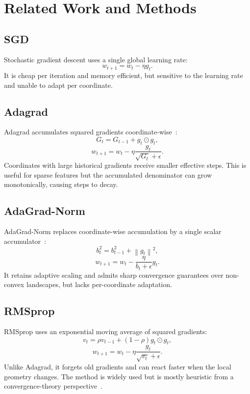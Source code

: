 \documentclass{article}
\newcommand{\norm}[1]{\left\lVert #1 \right\rVert}
\begin{document}
\section{Related Work and Methods}
\subsection{SGD}
Stochastic gradient descent uses a single global learning rate:
\begin{equation}
    w_{t+1}=w_t-\eta g_t.
\end{equation}
It is cheap per iteration and memory efficient, but sensitive to the learning rate and unable to adapt per coordinate.

\subsection{Adagrad}
Adagrad accumulates squared gradients coordinate-wise~\citep{duchi2011adaptive}:
\begin{equation}
    G_t=G_{t-1}+g_t\odot g_t,
\end{equation}
\begin{equation}
    w_{t+1}=w_t-\eta \frac{g_t}{\sqrt{G_t}+\epsilon}.
\end{equation}
Coordinates with large historical gradients receive smaller effective steps. This is useful for sparse features but the accumulated denominator can grow monotonically, causing steps to decay.

\subsection{AdaGrad-Norm}
AdaGrad-Norm replaces coordinate-wise accumulation by a single scalar accumulator~\citep{ward2020adagrad}:
\begin{equation}
    b_t^2=b_{t-1}^2+\norm{g_t}^2,
\end{equation}
\begin{equation}
    w_{t+1}=w_t-\frac{\eta}{b_t+\epsilon}g_t.
\end{equation}
It retains adaptive scaling and admits sharp convergence guarantees over non-convex landscapes, but lacks per-coordinate adaptation.

\subsection{RMSprop}
RMSprop uses an exponential moving average of squared gradients:
\begin{equation}
    v_t=\rho v_{t-1}+(1-\rho)g_t\odot g_t,
\end{equation}
\begin{equation}
    w_{t+1}=w_t-\eta\frac{g_t}{\sqrt{v_t}+\epsilon}.
\end{equation}
Unlike Adagrad, it forgets old gradients and can react faster when the local geometry changes. The method is widely used but is mostly heuristic from a convergence-theory perspective~\citep{ruder2016overview}.
\end{document}
